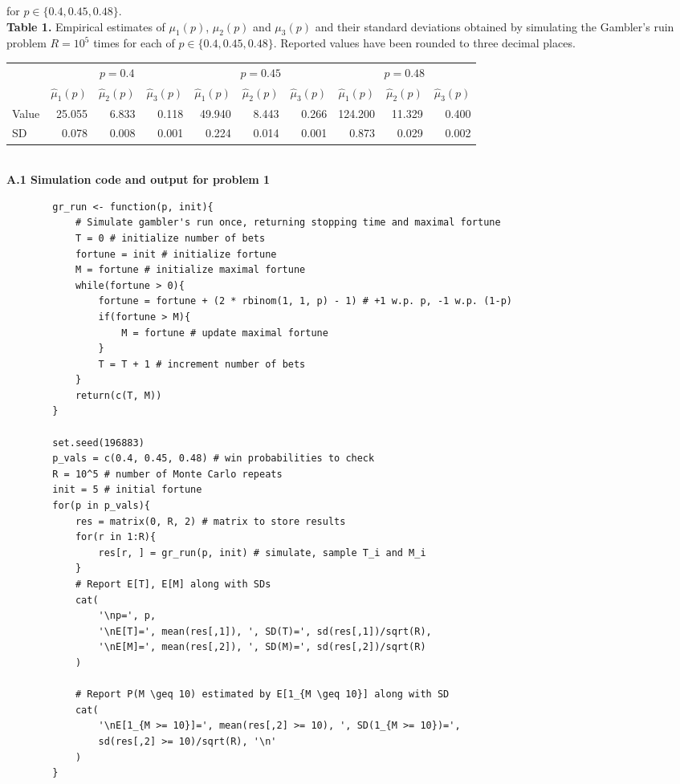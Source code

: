 \documentclass[11pt, letterpaper]{article}
\begin{document}
    for $p\in\{0.4, 0.45, 0.48\}$.\\[10pt] 
    {\bf Table 1.} Empirical estimates of $\mu_1(p)$, $\mu_2(p)$ and $\mu_3(p)$ and their standard deviations obtained by simulating the Gambler's ruin problem $R=10^5$ times for each of $p\in\{0.4, 0.45, 0.48\}$.
    Reported values have been rounded to three decimal places.
    \begin{center}
        \begin{tabular}{@{}l|rrrrrrrrr@{}}\toprule
                & \multicolumn{3}{c}{$p=0.4$} & \multicolumn{3}{c}{$p=0.45$} & \multicolumn{3}{c}{$p=0.48$}\\
            \cmidrule(lr){2-4}\cmidrule(lr){5-7}\cmidrule(lr){8-10}
                & $\hat{\mu}_1(p)$ & $\hat{\mu}_2(p)$ & $\hat{\mu}_3(p)$ & $\hat{\mu}_1(p)$ & $\hat{\mu}_2(p)$ & $\hat{\mu}_3(p)$ & $\hat{\mu}_1(p)$ & $\hat{\mu}_2(p)$ & $\hat{\mu}_3(p)$ \\\midrule
            Value & 25.055 & 6.833 & 0.118 & 49.940 & 8.443 & 0.266 & 124.200 & 11.329 & 0.400 \\ 
            SD & 0.078 & 0.008 & 0.001 & 0.224 & 0.014 & 0.001 & 0.873 & 0.029 & 0.002\\
            \bottomrule
        \end{tabular}
    \end{center}
    \\[10pt]
    {\bf A.1 Simulation code and output for problem 1}
    \begin{verbatim}
        gr_run <- function(p, init){
            # Simulate gambler's run once, returning stopping time and maximal fortune
            T = 0 # initialize number of bets
            fortune = init # initialize fortune
            M = fortune # initialize maximal fortune
            while(fortune > 0){
                fortune = fortune + (2 * rbinom(1, 1, p) - 1) # +1 w.p. p, -1 w.p. (1-p)
                if(fortune > M){
                    M = fortune # update maximal fortune 
                }
                T = T + 1 # increment number of bets
            }
            return(c(T, M))
        }

        set.seed(196883)
        p_vals = c(0.4, 0.45, 0.48) # win probabilities to check
        R = 10^5 # number of Monte Carlo repeats
        init = 5 # initial fortune
        for(p in p_vals){
            res = matrix(0, R, 2) # matrix to store results
            for(r in 1:R){
                res[r, ] = gr_run(p, init) # simulate, sample T_i and M_i
            }
            # Report E[T], E[M] along with SDs
            cat(
                '\np=', p,
                '\nE[T]=', mean(res[,1]), ', SD(T)=', sd(res[,1])/sqrt(R),
                '\nE[M]=', mean(res[,2]), ', SD(M)=', sd(res[,2])/sqrt(R)
            )

            # Report P(M \geq 10) estimated by E[1_{M \geq 10}] along with SD
            cat(
                '\nE[1_{M >= 10}]=', mean(res[,2] >= 10), ', SD(1_{M >= 10})=',
                sd(res[,2] >= 10)/sqrt(R), '\n'
            )
        }
    \end{verbatim}
\end{document}
